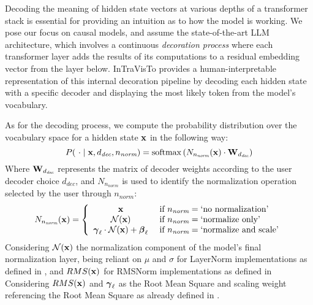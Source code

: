     Decoding the meaning of hidden state vectors at various depths of a transformer stack is essential for providing an intuition as to how the model is working.
    We pose our focus on causal models, and assume the state-of-the-art LLM architecture, which involves a continuous \emph{decoration process} where each transformer layer adds the results of its computations to a residual embedding vector from the layer below.
    InTraVisTo provides a human-interpretable representation of this internal decoration pipeline by decoding each hidden state with a specific decoder and displaying the most likely token from the model's vocabulary.

    As for the decoding process, we compute the probability distribution over the vocabulary space for a hidden state $\bm{\mathbf{x}}$ in the following way:
    \begin{equation}
        \label{eq:method_intravisto_decoding}
        P(\ \cdot \mid \bm{\mathbf{x}}, d_\textit{dec}, n_\textit{norm}) = \mathrm{softmax}\left(N_{n_\textit{norm}}(\bm{\mathbf{x}}) \cdot \bm{\mathbf{W}}_{d_\textit{dec}}\right)
    \end{equation}
    Where $\bm{\mathbf{W}}_{d_\textit{dec}}$ represents the matrix of decoder weights according to the user decoder choice $d_\textit{dec}$, and $N_{n_\textit{norm}}$ is used to identify the normalization operation selected by the user through $n_\textit{norm}$:
    \begin{equation}
        N_{n_\textit{norm}}(\bm{\mathbf{x}}) = 
        \label{eq:method_intravisto_normalization}
        \left\{
        \begin{array}{cl}
            \bm{\mathbf{x}} &\ \text{if}\ n_\textit{norm} = \text{`no normalization'} \\
            \mathcal{N}{(\bm{\mathbf{x}})} &\ \text{if}\ n_\textit{norm} = \text{`normalize only'} \\
            \bm{\mathbf{\gamma}}_\ell \cdot \mathcal{N}{(\bm{\mathbf{x}})} + \bm{\mathbf{\beta}}_\ell &\ \text{if}\ n_\textit{norm} = \text{`normalize and scale'}
        \end{array}
        \right.
    \end{equation}
    Considering $\mathcal{N}{(\bm{\mathbf{x}})}$ the normalization component of the model's final normalization layer, being reliant on $\mu$ and $\sigma$ for LayerNorm implementations as defined in , and $RMS(\bm{\mathbf{x}})$ for RMSNorm implementations as defined in 
    Considering $RMS(\bm{\mathbf{x}})$ and $\bm{\mathbf{\gamma}}_\ell$ as the Root Mean Square and scaling weight referencing the Root Mean Square as already defined in .

